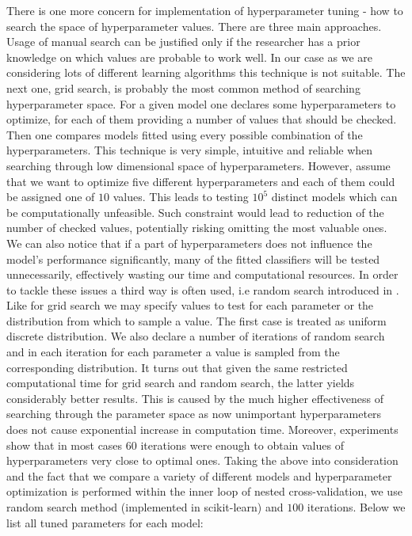 \documentclass[shortabstract, english, mgr]{iithesis}
\begin{document}
There is one more concern for implementation of hyperparameter tuning - how to search the space of hyperparameter values. There are three main approaches. Usage of manual search can be justified only if the researcher has a prior knowledge on which values are probable to work well. In our case as we are considering lots of different learning algorithms this technique is not suitable. The next one, grid search, is probably the most common method of searching hyperparameter space. For a given model one declares some hyperparameters to optimize, for each of them providing a number of values that should be checked. Then one compares models fitted using every possible combination of the hyperparameters. This technique is very simple, intuitive and reliable when searching through low dimensional space of hyperparameters. However, assume that we want to optimize five different hyperparameters and each of them could be assigned one of $10$ values. This leads to testing $10^5$ distinct models which can be computationally unfeasible. Such constraint would lead to reduction of the number of checked values, potentially risking omitting the most valuable ones. We can also notice that if a part of hyperparameters does not influence the model's performance significantly, many of the fitted classifiers will be tested unnecessarily, effectively wasting our time and computational resources. In order to tackle these issues a third way is often used, i.e random search introduced in \cite{randomSearch}. Like for grid search we may specify values to test for each parameter or the distribution from which to sample a value. The first case is treated as uniform discrete distribution. We also declare a number of iterations of random search and in each iteration for each parameter a value is sampled from the corresponding distribution. It turns out that given the same restricted computational time for grid search and random search, the latter yields considerably better results. This is caused by the much higher effectiveness of searching through the parameter space as now unimportant hyperparameters does not cause exponential increase in computation time. Moreover, experiments show that in most cases $60$ iterations were enough to obtain values of hyperparameters very close to optimal ones. Taking the above into consideration and the fact that we compare a variety of different models and hyperparameter optimization is performed within the inner loop of nested cross-validation, we use random search method (implemented in scikit-learn) and $100$ iterations. Below we list all tuned parameters for each model:
\end{document}
